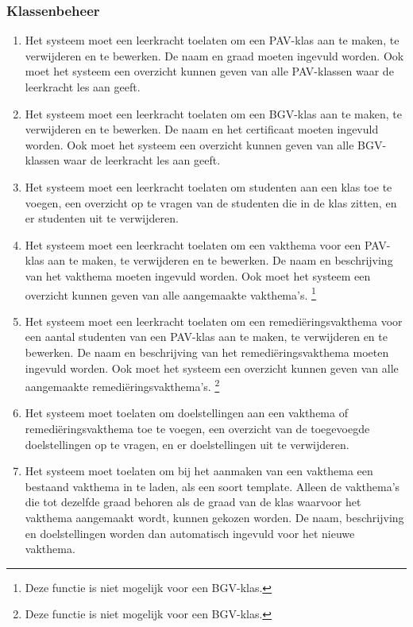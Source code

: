 \documentclass[a4paper]{article}
\begin{document}
\subsubsection{Klassenbeheer}
\begin{enumerate}[label=F\arabic*,resume]
\item Het systeem moet een leerkracht toelaten om een PAV-klas aan te maken, te verwijderen en te bewerken. De naam en graad moeten ingevuld worden. Ook moet het systeem een overzicht kunnen geven van alle PAV-klassen waar de leerkracht les aan geeft.
\item Het systeem moet een leerkracht toelaten om een BGV-klas aan te maken, te verwijderen en te bewerken. De naam en het certificaat moeten ingevuld worden. Ook moet het systeem een overzicht kunnen geven van alle BGV-klassen waar de leerkracht les aan geeft.
\item Het systeem moet een leerkracht toelaten om studenten aan een klas toe te voegen, een overzicht op te vragen van de studenten die in de klas zitten, en er studenten uit te verwijderen.
\item Het systeem moet een leerkracht toelaten om een vakthema voor een PAV-klas aan te maken, te verwijderen en te bewerken. De naam en beschrijving van het vakthema moeten ingevuld worden. Ook moet het systeem een overzicht kunnen geven van alle aangemaakte vakthema's. \footnote{Deze functie is niet mogelijk voor een BGV-klas.}
\item Het systeem moet een leerkracht toelaten om een remediëringsvakthema voor een aantal studenten van een PAV-klas aan te maken, te verwijderen en te bewerken. De naam en beschrijving van het remediëringsvakthema moeten ingevuld worden. Ook moet het systeem een overzicht kunnen geven van alle aangemaakte remediëringsvakthema's. \footnote{Deze functie is niet mogelijk voor een BGV-klas.}
\item Het systeem moet toelaten om doelstellingen aan een vakthema of remediëringsvakthema toe te voegen, een overzicht van de toegevoegde doelstellingen op te vragen, en er doelstellingen uit te verwijderen.
\item Het systeem moet toelaten om bij het aanmaken van een vakthema een bestaand vakthema in te laden, als een soort template. Alleen de vakthema's die tot dezelfde graad behoren als de graad van de klas waarvoor het vakthema aangemaakt wordt, kunnen gekozen worden. De naam, beschrijving en doelstellingen worden dan automatisch ingevuld voor het nieuwe vakthema.
\end{enumerate}
\end{document}
